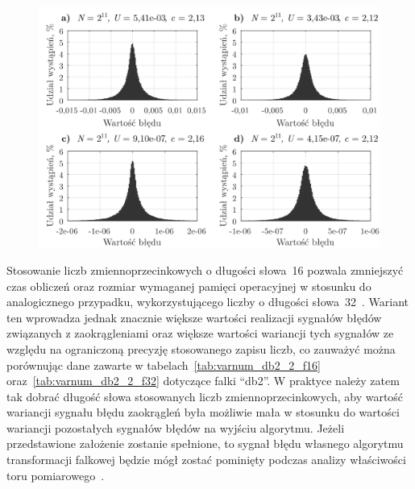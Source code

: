 \begin{figure}[htb!]
\begin{center}
\includegraphics{obrazki/hist_numerr_coif5}
\end{center}
\end{figure}

Stosowanie liczb zmiennoprzecinkowych o długości słowa~\qty{16}{\bitOw} pozwala zmniejszyć czas obliczeń oraz rozmiar wymaganej pamięci operacyjnej w stosunku do analogicznego przypadku, wykorzystującego liczby o długości słowa~\qty{32}{\bitOw}~\cite{reay_dsp, gcc_manual}. Wariant ten wprowadza jednak znacznie większe wartości realizacji sygnałów błędów związanych z zaokrągleniami oraz większe wartości wariancji tych sygnałów ze względu na ograniczoną precyzję stosowanego zapisu liczb, co zauważyć można porównując dane zawarte w tabelach~\ref{tab:varnum_db2_2_f16} oraz~\ref{tab:varnum_db2_2_f32} dotyczące falki \enquote{db2}. W praktyce należy zatem tak dobrać długość słowa stosowanych liczb zmiennoprzecinkowych, aby wartość wariancji sygnału błędu zaokrągleń była możliwie mała w stosunku do wartości wariancji pozostałych sygnałów błędów na wyjściu algorytmu. Jeżeli przedstawione założenie zostanie spełnione, to sygnał błędu własnego algorytmu transformacji falkowej będzie mógł zostać pominięty podczas analizy właściwości toru pomiarowego~\cite{jcgm_guide}.

